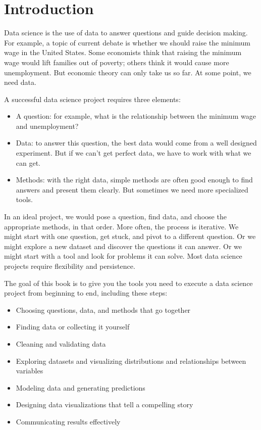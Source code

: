 \section{Introduction}

Data science is the use of data to answer questions and guide decision
making. For example, a topic of current debate is whether we should
raise the minimum wage in the United States. Some economists think that
raising the minimum wage would lift families out of poverty; others
think it would cause more unemployment. But economic theory can only
take us so far. At some point, we need data.

A successful data science project requires three elements:

\begin{itemize}
\item
  A question: for example, what is the relationship between the minimum
  wage and unemployment?
\item
  Data: to answer this question, the best data would come from a
  well designed experiment. But if we can't get perfect data, we have to
  work with what we can get.
\item
  Methods: with the right data, simple methods are often good enough to find
  answers and present them clearly. But sometimes we need more
  specialized tools.
\end{itemize}

In an ideal project, we would pose a question, find data, and choose the
appropriate methods, in that order. More often, the process is
iterative. We might start with one question, get stuck, and pivot to a
different question. Or we might explore a new dataset and discover the
questions it can answer. Or we might start with a tool and look for
problems it can solve. Most data science projects require flexibility
and persistence.

The goal of this book is to give you the tools you need to execute a
data science project from beginning to end, including these steps:

\begin{itemize}
\item
  Choosing questions, data, and methods that go together
\item
  Finding data or collecting it yourself
\item
  Cleaning and validating data
\item
  Exploring datasets and visualizing distributions and relationships
  between variables
\item
  Modeling data and generating predictions
\item
  Designing data visualizations that tell a compelling story
\item
  Communicating results effectively
\end{itemize}

